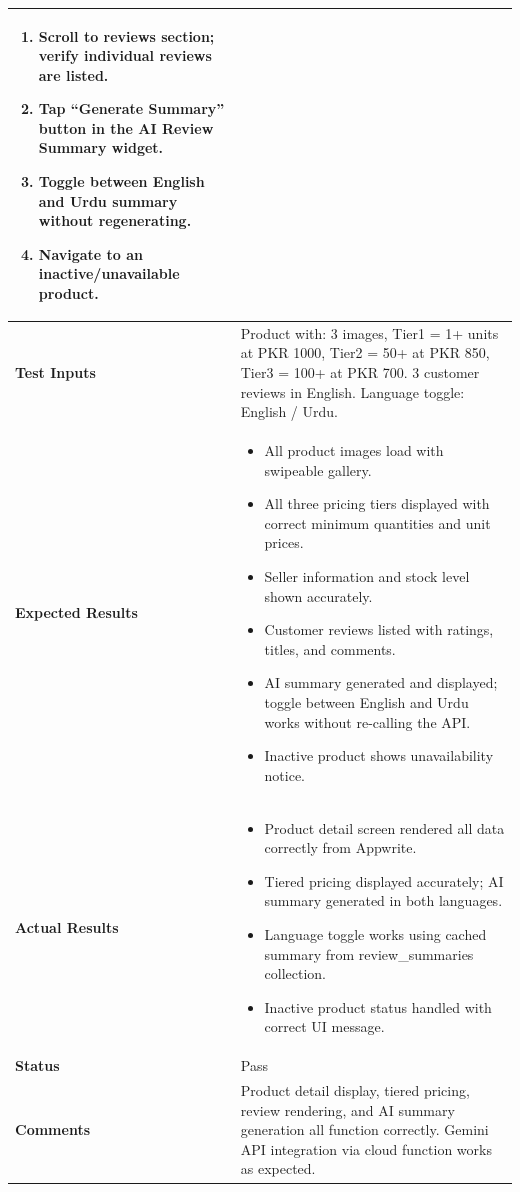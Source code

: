 {\begin{longtable}{|p{3.2cm}|p{10.8cm}|}
\begin{enumerate}[leftmargin=*,noitemsep]
\item Scroll to reviews section; verify individual reviews are listed.
\item Tap ``Generate Summary'' button in the AI Review Summary widget.
\item Toggle between English and Urdu summary without regenerating.
\item Navigate to an inactive/unavailable product.
\end{enumerate} \\ \hline
\textbf{Test Inputs} & Product with: 3 images, Tier1 = 1+ units at PKR 1000, Tier2 = 50+ at PKR 850, Tier3 = 100+ at PKR 700. 3 customer reviews in English. Language toggle: English / Urdu. \\ \hline
\textbf{Expected Results} &
\begin{itemize}[leftmargin=*,noitemsep]
\item All product images load with swipeable gallery.
\item All three pricing tiers displayed with correct minimum quantities and unit prices.
\item Seller information and stock level shown accurately.
\item Customer reviews listed with ratings, titles, and comments.
\item AI summary generated and displayed; toggle between English and Urdu works without re-calling the API.
\item Inactive product shows unavailability notice.
\end{itemize} \\ \hline
\textbf{Actual Results} &
\begin{itemize}[leftmargin=*,noitemsep]
\item Product detail screen rendered all data correctly from Appwrite.
\item Tiered pricing displayed accurately; AI summary generated in both languages.
\item Language toggle works using cached summary from review\_summaries collection.
\item Inactive product status handled with correct UI message.
\end{itemize} \\ \hline
\textbf{Status} & Pass \\ \hline
\textbf{Comments} & Product detail display, tiered pricing, review rendering, and AI summary generation all function correctly. Gemini API integration via cloud function works as expected. \\ \hline
\end{longtable}
}

